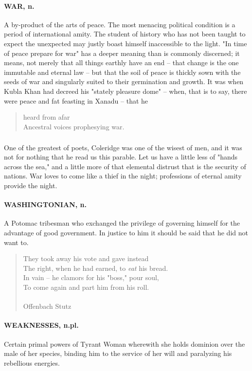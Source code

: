 \documentclass[11pt]{article}
\begin{document}
\paragraph{WAR, n.}  A by-product of the arts of peace.  The most menacing
political condition is a period of international amity.  The student
of history who has not been taught to expect the unexpected may justly
boast himself inaccessible to the light.  "In time of peace prepare
for war" has a deeper meaning than is commonly discerned; it means,
not merely that all things earthly have an end -- that change is the
one immutable and eternal law -- but that the soil of peace is thickly
sown with the seeds of war and singularly suited to their germination
and growth.  It was when Kubla Khan had decreed his "stately pleasure
dome" -- when, that is to say, there were peace and fat feasting in
Xanadu -- that he

\begin{quote}                       heard from afar \\
  Ancestral voices prophesying war.
 \end{quote}
  
\subparagraph{}  One of the greatest of poets, Coleridge was one of the wisest of
men, and it was not for nothing that he read us this parable.  Let us
have a little less of "hands across the sea," and a little more of
that elemental distrust that is the security of nations.  War loves to
come like a thief in the night; professions of eternal amity provide
the night.

\paragraph{WASHINGTONIAN, n.}  A Potomac tribesman who exchanged the privilege of
governing himself for the advantage of good government.  In justice to
him it should be said that he did not want to.

\begin{quote}   They took away his vote and gave instead \\
  The right, when he had earned, to {\em eat} his bread. \\
  In vain -- he clamors for his "boss," pour soul, \\
  To come again and part him from his roll. \\
 \\
Offenbach Stutz \end{quote}


\paragraph{WEAKNESSES, n.pl.}  Certain primal powers of Tyrant Woman wherewith she
holds dominion over the male of her species, binding him to the
service of her will and paralyzing his rebellious energies.
\end{document}
